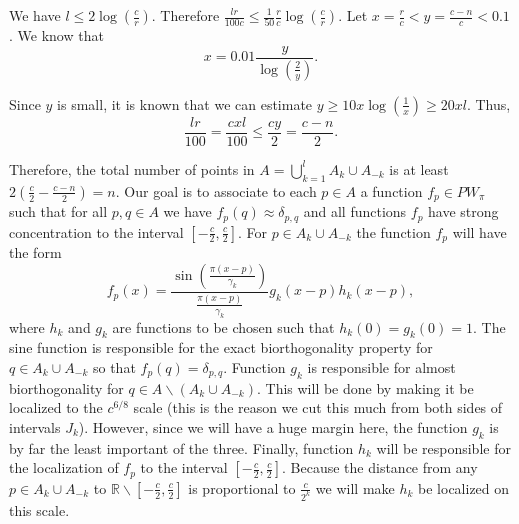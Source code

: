 \documentclass[12pt]{amsart}
\numberwithin{equation}{section}
\newcommand{\R}{\mathbb{R}}
\begin{document}
We have $l \le 2\log(\frac{c}{r})$. Therefore $\frac{lr}{100c} \le \frac{1}{50}\frac{r}{c}\log(\frac{c}{r})$. Let $x = \frac{r}{c} < y = \frac{c-n}{c}< 0.1$. We know that 
$$x = 0.01\frac{y}{\log(\frac{2}{y})}.$$

Since $y$ is small, it is known that we can estimate $y\ge 10x\log(\frac{1}{x})\ge 20xl$. Thus, $$\frac{lr}{100} = \frac{cxl}{100}\le \frac{cy}{2}=\frac{c-n}{2}.$$

Therefore, the total number of points in $A=\bigcup_{k=1}^l A_k\cup A_{-k}$ is at least $2(\frac{c}{2}-\frac{c-n}{2}) = n$. Our goal is to associate to each $p\in A$ a function $f_p\in PW_\pi$ such that for all $p, q\in A$ we have $f_p(q)\approx \delta_{p,q}$ and all functions $f_p$ have strong concentration to the interval $[-\frac{c}{2},\frac{c}{2}]$. For $p\in A_k\cup A_{-k}$ the function $f_p$ will have the form
$$f_p(x) = \frac{\sin(\frac{\pi (x-p)}{\gamma_k})}{\frac{\pi (x-p)}{\gamma_k}}g_k(x-p)h_k(x-p),$$
where $h_k$ and $g_k$ are functions to be chosen such that $h_k(0)=g_k(0)=1$. The sine function is responsible for the exact biorthogonality property for $q\in A_k\cup A_{-k}$ so that $f_p(q)=\delta_{p,q}$. Function $g_k$ is responsible for almost biorthogonality for $q\in A\backslash (A_k\cup A_{-k})$. This will be done by making it be localized to the $c^{6/8}$ scale (this is the reason we cut this much from both sides of intervals $J_k$). However, since we will have a huge margin here, the function $g_k$ is by far the least important of the three. Finally, function $h_k$ will be responsible for the localization of $f_p$ to the interval $[-\frac{c}{2},\frac{c}{2}]$. Because the distance from any $p\in A_{k}\cup A_{-k}$ to $\R\backslash[-\frac{c}{2},\frac{c}{2}]$ is proportional to $\frac{c}{2^k}$ we will make $h_k$ be localized on this scale.
\end{document}
